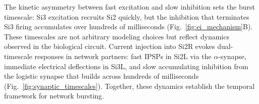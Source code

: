 The kinetic asymmetry between fast excitation and slow inhibition sets the burst timescale: Si3 excitation recruits Si2 quickly, but the inhibition that terminates Si3 firing accumulates over hundreds of milliseconds (Fig.~\ref{fig:ei_mechanism}B).
These timescales are not arbitrary modeling choices but reflect dynamics observed in the biological circuit.
Current injection into Si2R evokes dual-timescale responses in network partners: fast IPSPs in Si2L via the $\alpha$-synapse, immediate electrical deflections in Si3L, and slow accumulating inhibition from the logistic synapse that builds across hundreds of milliseconds (Fig.~\ref{fig:synaptic_timescales}).
Together, these dynamics establish the temporal framework for network bursting.
